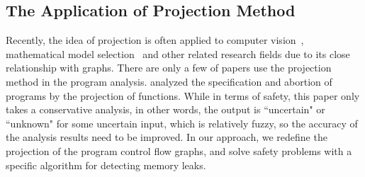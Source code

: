 \subsection{The Application of Projection Method}
Recently, the idea of projection is often applied to computer vision~\cite{DG14, HWS15}, mathematical model selection~\cite{NL10,ZYC17} and other related research fields due to its close relationship with graphs. There are only a few of papers use the projection method in the program analysis. \cite{D94} analyzed the specification and abortion of programs by the projection of functions. While in terms of safety, this paper only takes a conservative analysis, in other words, the output is ``uncertain" or ``unknown" for some uncertain input, which is relatively fuzzy, so the accuracy of the analysis results need to be improved. In our approach, we redefine the projection of the program control flow graphs, and solve safety problems with a specific algorithm for detecting memory leaks.
